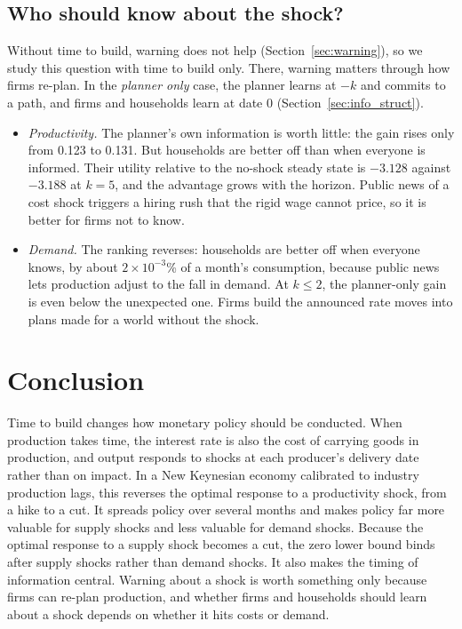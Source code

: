 \documentclass[11pt]{article}
\theoremstyle{definition}
\begin{document}
\subsection{Who should know about the shock?}\label{sec:info}

Without time to build, warning does not help (Section~\ref{sec:warning}), so we study this question
with time to build only. There, warning matters through how firms re-plan. In the \emph{planner only}
case, the planner learns at $-k$ and commits to a path, and firms and households learn at date 0
(Section~\ref{sec:info_struct}).

\begin{itemize}
  \item \emph{Productivity.} The planner's own information is worth little: the gain rises only from
        0.123 to 0.131. But households are better off than when everyone is informed. Their utility
        relative to the no-shock steady state is $-3.128$ against $-3.188$ at $k=5$, and the advantage
        grows with the horizon. Public news of a cost shock triggers a hiring rush that the rigid wage
        cannot price, so it is better for firms not to know.
  \item \emph{Demand.} The ranking reverses: households are better off when everyone knows, by about
        $2\times10^{-3}$\% of a month's consumption, because public news lets production adjust to the
        fall in demand. At $k\le2$, the planner-only gain is even below the unexpected one. Firms build
        the announced rate moves into plans made for a world without the shock.
\end{itemize}

\clearpage
\section{Conclusion}\label{sec:concl}

Time to build changes how monetary policy should be conducted. When production takes time, the
interest rate is also the cost of carrying goods in production, and output responds to shocks at
each producer's delivery date rather than on impact. In a New Keynesian economy calibrated to industry
production lags, this reverses the optimal response to a productivity shock, from a hike to a cut. It
spreads policy over several months and makes policy far more valuable for supply shocks and less
valuable for demand shocks. Because the optimal response to a supply shock becomes a cut, the zero
lower bound binds after supply shocks rather than demand shocks. It also makes the timing of
information central. Warning about a shock is
worth something only because firms can re-plan production, and whether firms and households should
learn about a shock depends on whether it hits costs or demand.
\end{document}
